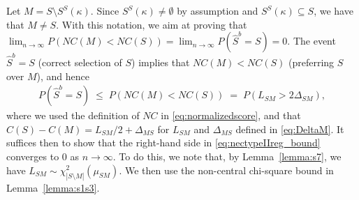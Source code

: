 \documentclass[bj,authoryear]{imsart}
\theoremstyle{plain}
\begin{document}
Let $M=S\setminus S^{S}(\kappa)$. Since $S^{S}(\kappa)\neq \emptyset$ by assumption and $S^S(\kappa)\subseteq S$, we have that $M\neq S$. With this notation, we aim at proving that $\lim_{n\to \infty}P(NC(M)<NC(S))=\lim_{n\to \infty}P(\hat S^b=S)=0$. The event $\hat{S}^b=S$ (correct selection of $S$) implies that $NC(M)< NC(S)$ (preferring $S$ over $M$), and hence 
\begin{align}\label{eq:nectypeIIreg_bound}
P(\hat{S}^b=S)\;\leq\; P\left( NC(M) < NC(S) \right)
\;=\; P(L_{SM}> 2\Delta_{SM}),
\end{align}
where we used the definition of $NC$ in
\eqref{eq:normalizedscore}, and that $C(S)-C(M)=L_{SM}/2 + \Delta_{MS}$ for $L_{SM}$ and $\Delta_{MS}$ defined in \eqref{eq:DeltaM}. It suffices then to show that the right-hand side in \eqref{eq:nectypeIIreg_bound} converges to 0 as $n \to \infty$.
To do this, we note that, by Lemma~\ref{lemma:s7}, we have $L_{SM}\sim \chi_{|S\setminus M|}^2(\mu_{SM})$. We then use the non-central chi-square bound in Lemma~\ref{lemma:s1s3}.
\end{document}

